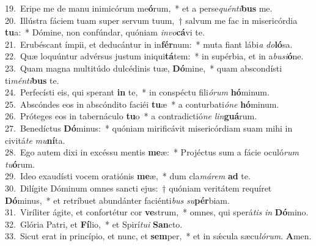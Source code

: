 {19.~}Eripe me de manu inimicórum me\textbf{ó}rum,~* et a perse\textit{quén}\textit{ti}\textbf{bus} me.\\
{20.~}Illústra fáciem tuam super servum tuum,~† salvum me fac in misericórdia \textbf{tu}a:~* Dómine, non confúndar, quóniam \textit{in}\textit{vo}\textbf{cá}vi te.\\
{21.~}Erubéscant ímpii, et deducántur in in\textbf{fér}num:~* muta fiant lábi\textit{a} \textit{do}\textbf{ló}sa.\\
{22.~}Quæ loquúntur advérsus justum iniqui\textbf{tá}tem:~* in supérbia, et in a\textit{bu}\textit{si}\textbf{ó}ne.\\
{23.~}Quam magna multitúdo dulcédinis tuæ, \textbf{Dó}mine,~* quam abscondísti ti\textit{mén}\textit{ti}\textbf{bus} te.\\
{24.~}Perfecísti eis, qui sperant \textbf{in} te,~* in conspéctu fili\textit{ó}\textit{rum} \textbf{hó}minum.\\
{25.~}Abscóndes eos in abscóndito faciéi \textbf{tu}æ~* a conturbati\textit{ó}\textit{ne} \textbf{hó}minum.\\
{26.~}Próteges eos in tabernáculo \textbf{tu}o~* a contradictió\textit{ne} \textit{lin}\textbf{guá}rum.\\
{27.~}Benedíctus \textbf{Dó}minus:~* quóniam mirificávit misericórdiam suam mihi in civitá\textit{te} \textit{mu}\textbf{ní}ta.\\
{28.~}Ego autem dixi in excéssu mentis \textbf{me}æ:~* Projéctus sum a fácie oculó\textit{rum} \textit{tu}\textbf{ó}rum.\\
{29.~}Ideo exaudísti vocem oratiónis \textbf{me}æ,~* dum cla\textit{má}\textit{rem} \textbf{ad} te.\\
{30.~}Dilígite Dóminum omnes sancti ejus:~† quóniam veritátem requíret \textbf{Dó}minus,~* et retríbuet abundánter faciénti\textit{bus} \textit{su}\textbf{pér}biam.\\
{31.~}Viríliter ágite, et confortétur cor \textbf{ve}strum,~* omnes, qui sperá\textit{tis} \textit{in} \textbf{Dó}mino.\\
{32.~}Glória Patri, et \textbf{Fí}lio,~* et Spirí\textit{tu}\textit{i} \textbf{San}cto.\\
{33.~}Sicut erat in princípio, et nunc, et \textbf{sem}per,~* et in sǽcula sæcu\textit{ló}\textit{rum}. \textbf{A}men.\\
